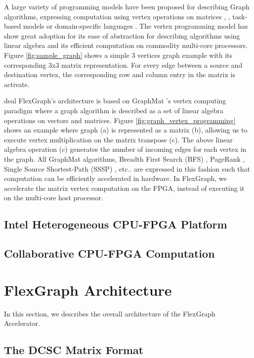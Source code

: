 A large variety of programming models have been proposed for describing Graph algorithms, expressing computation using vertex operations on matrices \cite{GraphMat} \cite{GraphLab}, \cite{Pregel}, \cite{MapGraph} \cite{GraphX} task-based models \cite{Galois} or domain-specific languages \cite{GreenMarl}. The vertex programming model has show great adoption for its ease of abstraction for describing algorithms using linear algebra and its efficient computation on commodity multi-core processors. Figure \ref{fig:sample_graph} shows a simple 3 vertices graph example with its corresponding 3x3 matrix representation. For every edge between a source and destination vertex, the corresponding row and column entry in the matrix is activate.  
 
 deal  FlexGraph's architecture is based on GraphMat \cite{GraphMat}'s vertex computing paradigm where a graph algorithm is described as a set of linear algebra operations on vectors and matrices. Figure \ref{fig:graph_vertex_programming} shows an example where graph (a) is represented as a matrix (b), allowing us to execute vertex multiplication on the matrix transpose (c). The above linear algebra operation (c) generates the number of incoming edges for each vertex in the graph. All GraphMat algorithms, Breadth First Search (BFS) \cite{BFS}, PageRank \cite{PageRank}, Single Source Shortest-Path (SSSP) \cite{SSSP}, etc.. are expressed in this fashion such that computation can be efficiently accelerated in hardware. In FlexGraph, we accelerate the matrix vertex computation on the FPGA, instead of executing it on the multi-core host processor.

\subsection{Intel Heterogeneous CPU-FPGA Platform}

\subsection{Collaborative CPU-FPGA Computation}

\section{FlexGraph Architecture}

In this section, we describes the overall architecture of the FlexGraph Accelerator.

\subsection{The DCSC Matrix Format}

